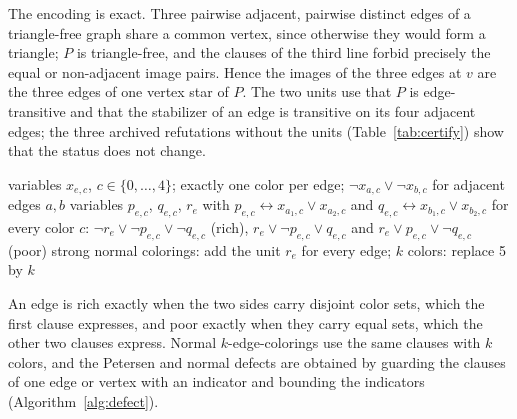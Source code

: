 \documentclass[11pt]{article}
\theoremstyle{definition}
\theoremstyle{remark}
\newcommand{\PG}{P}
\begin{document}
The encoding is exact. Three pairwise adjacent, pairwise distinct edges of a triangle-free graph
share a common vertex, since otherwise they would form a triangle; $\PG$ is triangle-free, and the
clauses of the third line forbid precisely the equal or non-adjacent image pairs. Hence the
images of the three edges at $v$ are the three edges of one vertex star of $\PG$. The two units use
that $\PG$ is edge-transitive and that the stabilizer of an edge is transitive on its four adjacent
edges; the three archived refutations without the units (Table~\ref{tab:certify}) show that the
status does not change.

\begin{algorithm}[htbp]
\caption{Normal 5-edge-coloring encoding (computations EXP-001, EXP-004, EXP-006)}\label{alg:normal}
\begin{algorithmic}[1]
\State variables $x_{e,c}$, $c \in \{0,\dots,4\}$; exactly one color per edge; $\lnot x_{a,c} \lor \lnot x_{b,c}$ for adjacent edges $a,b$
 \State variables $p_{e,c}$, $q_{e,c}$, $r_e$ with $p_{e,c} \leftrightarrow x_{a_1,c} \lor x_{a_2,c}$ and $q_{e,c} \leftrightarrow x_{b_1,c} \lor x_{b_2,c}$
 \State for every color $c$: $\lnot r_e \lor \lnot p_{e,c} \lor \lnot q_{e,c}$ (rich), $r_e \lor \lnot p_{e,c} \lor q_{e,c}$ and $r_e \lor p_{e,c} \lor \lnot q_{e,c}$ (poor)
\EndFor
\State strong normal colorings: add the unit $r_e$ for every edge; $k$ colors: replace 5 by $k$
\end{algorithmic}
\end{algorithm}

An edge is rich exactly when the two sides carry disjoint color sets, which the first clause
expresses, and poor exactly when they carry equal sets, which the other two clauses express.
Normal $k$-edge-colorings use the same clauses with $k$ colors, and the Petersen and normal
defects are obtained by guarding the clauses of one edge or vertex with an indicator and bounding
the indicators (Algorithm~\ref{alg:defect}).
\end{document}
